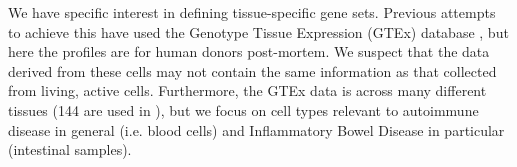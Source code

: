 \documentclass[12pt]{article} %
\begin{document}
%	
	
	
	We have specific interest in defining tissue-specific gene sets. Previous attempts to achieve this have used the Genotype Tissue Expression (GTEx) \cite{GTExConsortiumGeneticeffectsgene2017} database \cite{LonsdaleGenotypeTissueExpressionGTEx2013}, but here the profiles are for human donors
	post-mortem. We suspect that the data derived from these cells may not contain the same information as that collected from living, active cells. Furthermore, the GTEx data is across many different tissues (144 are used in \cite{LonsdaleGenotypeTissueExpressionGTEx2013}), but we focus on cell types relevant to autoimmune disease in general (i.e. blood cells) and Inflammatory Bowel Disease in particular (intestinal samples).
	
\end{document}
